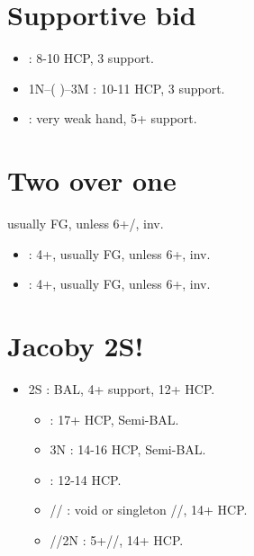 \documentclass[12pt,twoside,a5paper]{report}%
\begin{document}
	\section*{Supportive bid}
	\begin{itemize}
	\renewcommand{\labelitemi}{}
	\item {} : 8-10 HCP, 3\he{} support.
	\item 1N--( )--3M : 10-11 HCP, 3\he{} support.
	\item {} : very weak hand, 5+\he{} support.
	\end{itemize}

	\section*{Two over one}
	usually FG, unless 6+\cl{}/\di{}, inv.
	\begin{itemize}
	\renewcommand{\labelitemi}{}
	\item {} : 4+\cl{}, usually FG, unless 6+\cl{}, inv.
	\item {} : 4+\di{}, usually FG, unless 6+\di{}, inv.
	\end{itemize}
	
	\section*{Jacoby 2S!}
	\begin{itemize}
	\renewcommand{\labelitemi}{}
	\item 2S : BAL, 4+\he{} support, 12+ HCP.
		\begin{itemize}
		\renewcommand{\labelitemi}{--}
		\item {} : 17+ HCP, Semi-BAL.
		\item 3N : 14-16 HCP, Semi-BAL.
		\item {} : 12-14 HCP.
		\item {}// : void or singleton //, 14+ HCP.
		\item {}//2N : 5+//, 14+ HCP.
		\end{itemize}
	\end{itemize}
\end{document}

